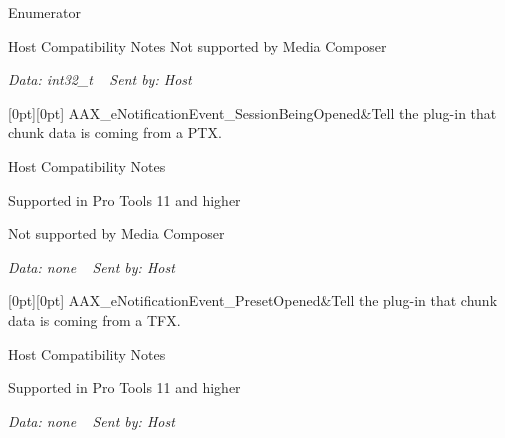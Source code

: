 \begin{DoxyEnumFields}{Enumerator}
\begin{DoxyRefDesc}{Host Compatibility Notes}
Not supported by Media Composer\end{DoxyRefDesc}


{\itshape Data\+: {\ttfamily int32\+\_\+t}} ~\newline
 {\itshape Sent by\+: Host} \\
\hline

[0pt][0pt]{}\mbox{\label{a00491_afab5ea2cfd731fc8f163b6caa685406ea013a21c2c111bac54b962b40f1b4bc1f}} 
A\+A\+X\+\_\+e\+Notification\+Event\+\_\+\+Session\+Being\+Opened&Tell the plug-\/in that chunk data is coming from a P\+TX. \begin{DoxyRefDesc}{Host Compatibility Notes}
\item[\mbox{\hyperlink{a00786__compatibility_notes000035}{Host Compatibility Notes}}]Supported in Pro Tools 11 and higher 

Not supported by Media Composer\end{DoxyRefDesc}


{\itshape Data\+: none} ~\newline
 {\itshape Sent by\+: Host} \\
\hline

[0pt][0pt]{}\mbox{\label{a00491_afab5ea2cfd731fc8f163b6caa685406eae80fd29dd36171bc1eb02b30e30825da}} 
A\+A\+X\+\_\+e\+Notification\+Event\+\_\+\+Preset\+Opened&Tell the plug-\/in that chunk data is coming from a T\+FX. \begin{DoxyRefDesc}{Host Compatibility Notes}
\item[\mbox{\hyperlink{a00786__compatibility_notes000036}{Host Compatibility Notes}}]Supported in Pro Tools 11 and higher\end{DoxyRefDesc}


{\itshape Data\+: none} ~\newline
 {\itshape Sent by\+: Host} \\
\hline


\end{DoxyEnumFields}
